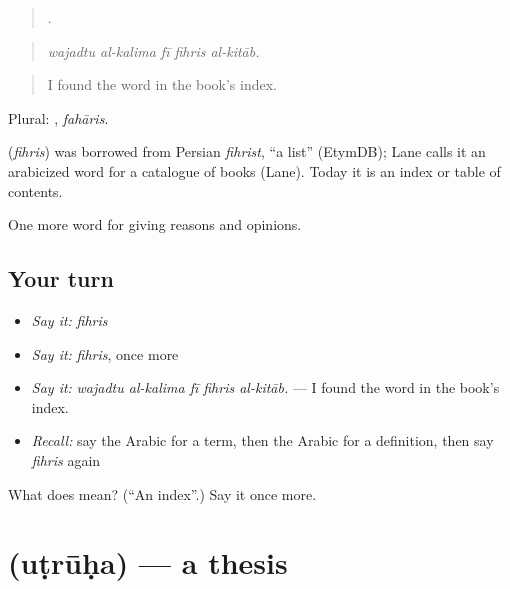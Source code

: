 \begin{quote}
    .
\end{quote}

\begin{quote}
\emph{wajadtu al-kalima fī fihris al-kitāb.}
\end{quote}

\begin{quote}
I found the word in the book's index.
\end{quote}

Plural: , \emph{fahāris}.

\begin{cousinweb}
\textbf{} (\emph{fihris}) was borrowed from Persian \emph{fihrist}, \textquotedblleft{}a list\textquotedblright{} (EtymDB); Lane calls it an arabicized word for a catalogue of books (Lane). Today it is an index or table of contents.
\end{cousinweb}

\begin{grammarlens}[title={What you've built}]
One more word for giving reasons and opinions.
\end{grammarlens}

\subsection*{Your turn}
\begin{itemize}
\raggedright
  \item \emph{Say it:} \emph{fihris}
  \item \emph{Say it:} \emph{fihris}, once more
  \item \emph{Say it:} \emph{wajadtu al-kalima fī fihris al-kitāb.} — I found the word in the book's index.
  \item \emph{Recall:} say the Arabic for a term, then the Arabic for a definition, then say \emph{fihris} again
\end{itemize}

\begin{tcolorbox}[breakable,colback=teal!4,colframe=teal!35!black,title={Before you move on}]
What does  mean? (\textquotedblleft{}An index\textquotedblright{}.) Say it once more.
\end{tcolorbox}
\section[\texorpdfstring{\ar{أطروحة} (uṭrūḥa)}{أطروحة (uṭrūḥa)}]{ (uṭrūḥa) — a thesis}

